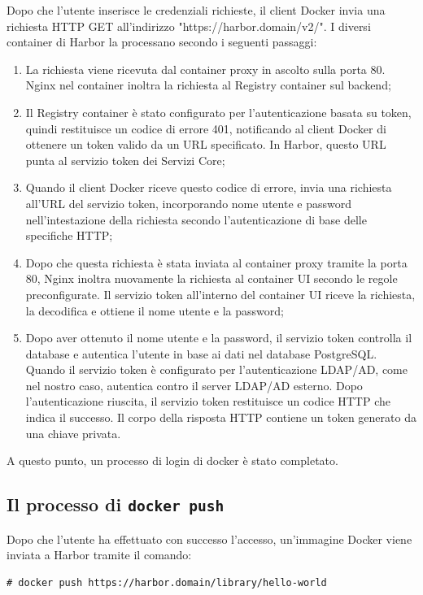 \documentclass[12pt]{report}
\begin{document}
Dopo che l'utente inserisce le credenziali richieste, il client Docker invia una richiesta HTTP GET all'indirizzo "https://harbor.domain/v2/". I diversi container di Harbor la processano secondo i seguenti passaggi:
\begin{enumerate}
    \item La richiesta viene ricevuta dal container proxy in ascolto sulla porta 80. Nginx nel container inoltra la richiesta al Registry container sul backend;
    \item Il Registry container è stato configurato per l'autenticazione basata su token, quindi restituisce un codice di errore 401, notificando al client Docker di ottenere un token valido da un URL specificato. In Harbor, questo URL punta al servizio token dei Servizi Core;
    \item Quando il client Docker riceve questo codice di errore, invia una richiesta all'URL del servizio token, incorporando nome utente e password nell'intestazione della richiesta secondo l'autenticazione di base delle specifiche HTTP;
    \item Dopo che questa richiesta è stata inviata al container proxy tramite la porta 80, Nginx inoltra nuovamente la richiesta al container UI secondo le regole preconfigurate. Il servizio token all'interno del container UI riceve la richiesta, la decodifica e ottiene il nome utente e la password;
    \item Dopo aver ottenuto il nome utente e la password, il servizio token controlla il database e autentica l'utente in base ai dati nel database PostgreSQL. Quando il servizio token è configurato per l'autenticazione LDAP/AD, come nel nostro caso, autentica contro il server LDAP/AD esterno. Dopo l'autenticazione riuscita, il servizio token restituisce un codice HTTP che indica il successo. Il corpo della risposta HTTP contiene un token generato da una chiave privata.
\end{enumerate}
A questo punto, un processo di login di docker è stato completato.

\subsection{Il processo di \texttt{docker push}}

Dopo che l'utente ha effettuato con successo l'accesso, un'immagine Docker viene inviata a Harbor tramite il comando:
\begin{verbatim}
# docker push https://harbor.domain/library/hello-world
\end{verbatim}
\end{document}
